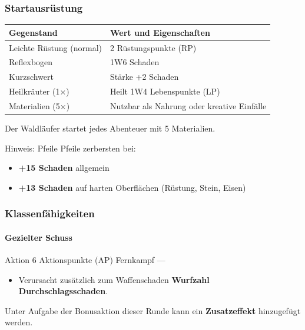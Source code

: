 \subsubsection*{Startausrüstung}

\begin{center}
	\begin{tabular}{lp{9cm}}
		\toprule
		\textbf{Gegenstand} & \textbf{Wert und Eigenschaften} \\
		\midrule
		Leichte Rüstung (normal) & 2 Rüstungspunkte (RP) \\
		Reflexbogen & 1W6 Schaden \\
		Kurzschwert & Stärke +2 Schaden \\
		Heilkräuter (1×) & Heilt 1W4 Lebenspunkte (LP) \\
		Materialien (5×) & Nutzbar als Nahrung oder kreative Einfälle \\
		\bottomrule
	\end{tabular}
\end{center}

Der Waldläufer startet jedes Abenteuer mit 5 Materialien.


\begin{rulebox}{Hinweis: Pfeile}
	Pfeile zerbersten bei:
	\begin{itemize}
		\item \textbf{+15 Schaden} allgemein
		\item \textbf{+13 Schaden} auf harten Oberflächen (Rüstung, Stein, Eisen)
	\end{itemize}
\end{rulebox}

\subsubsection*{Klassenfähigkeiten}

\paragraph*{Gezielter Schuss}
\skillcard
{}
{Aktion}
{6 Aktionspunkte (AP)}
{Fernkampf}
{—}
{
	\begin{itemize}
		\item Verursacht zusätzlich zum Waffenschaden
		\textbf{Wurfzahl Durchschlagsschaden}.
	\end{itemize}
}
{
	Unter Aufgabe der Bonusaktion dieser Runde
	kann ein \textbf{Zusatzeffekt} hinzugefügt werden.
}

